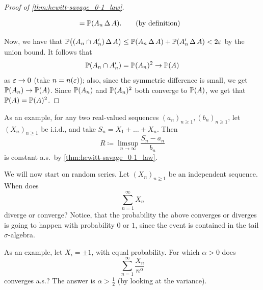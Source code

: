 \begin{proof}[Proof of \ref{thm:hewitt-savage_0-1_law}]
\begin{enumerate}[(i)]
\begin{align*}
            &= \mathbb P(A_n \, \Delta \, A). \tag{by definition}
        \end{align*}
    \end{enumerate}
    Now, we have that $\mathbb P\bigl((A_n \cap A_n') \, \Delta \, A\bigr) \leq \mathbb P(A_n \, \Delta \, A) + \mathbb P(A_n' \, \Delta \, A) < 2\varepsilon$ by the union bound. It follows that
    \[ \mathbb P(A_n \cap A_n') = \mathbb P(A_n)^2 \to \mathbb P(A) \]
    as $\varepsilon \to 0$ (take $n = n(\varepsilon)$); also, since the symmetric difference is small, we get $\mathbb P(A_n) \to \mathbb P(A)$. Since $\mathbb P(A_n)$ and $\mathbb P(A_n)^2$ both converge to $\mathbb P(A)$, we get that $\mathbb P(A) = \mathbb P(A)^2$.
\end{proof}

As an example, for any two real-valued sequences $(a_n)_{n \geq 1}, (b_n)_{n \geq 1}$, let $(X_n)_{n \geq 1}$ be i.i.d., and take $S_n = X_1 + \dots + X_n$. Then
\[ R \coloneq \limsup_{n \to \infty} \frac{S_n - a_n}{b_n} \]
is constant a.s.\ by \ref{thm:hewitt-savage_0-1_law}.

\newpage
We will now start on random series. Let $(X_n)_{n \geq 1}$ be an independent sequence. When does
\[ \sum_{n=1}^\infty X_n \]
diverge or converge? Notice, that the probability the above converges or diverges is going to happen with probability $0$ or $1$, since the event is contained in the tail $\sigma$-algebra.

As an example, let $X_i = \pm 1$, with equal probability. For which $\alpha > 0$ does
\[ \sum_{n=1}^\infty \frac{X_n}{n^\alpha} \]
converges a.s.? The answer is $\alpha > \frac{1}{2}$ (by looking at the variance).

